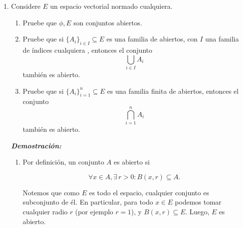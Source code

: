 \documentclass[letterpaper]{article}
\newcommand{\R}{\mathbb{R}}
\newcommand{\dem}{\textbf{\emph{Demostraci\'on: }}}
\newcommand{\norm}[1]{\lVert #1\rVert }
\begin{document}
\begin{enumerate}
\textbf{(b):} Sean $A\in\mathcal{M}_{d\times d},\, x\in\R^d$,

\[\norm{Ax}_1=\dfrac{\norm{Ax}_1}{\norm{x}_1}\norm{x}_1={\bigg\lVert\dfrac{Ax}{\norm{x}_1}\bigg\rVert}_1\norm{x}_1={\bigg\lVert A\dfrac{x}{\norm{x}_1}\bigg\rVert}_1\norm{x}_1\leq\sup_{\substack{y\in\R^d :\\
                  \norm{y}_1=1}}\norm{Ay}_1 \norm{x}_1
                  =\norm{A}\norm{x}_1\]
    
donde utilizamos que ${\bigg\lVert\dfrac{x}{\norm{x}_1}\bigg\rVert}_1=\dfrac{1}{\norm{x_1}}\norm{x_1}=1$.

\textbf{(c):} Sean $A,\, B\in\mathcal{M}_{d\times d}$,

\[\norm{AB}=\sup_{\substack{x\in\R^d :\\
                  \norm{x}_1=1}}\norm{(AB)x}_1=
            \sup_{\substack{x\in\R^d :\\
                  \norm{x}_1=1}}\norm{A(Bx)}_1\underbrace{\leq}_{(b)}
            \sup_{\substack{x\in\R^d :\\
                  \norm{x}_1=1}}\norm{A}\norm{(Bx)}_1=
            \norm{A}\sup_{\substack{x\in\R^d :\\
                  \norm{x}_1=1}}\norm{(Bx)}_1=
            \norm{A}\norm{B} \mbox{ }
\]

\item Considere $E$ un espacio vectorial normado cualquiera.
\begin{enumerate}
    \item Pruebe que $\phi, E$ son conjuntos abiertos.
    \item Pruebe que si $\{A_i\}_{i\in I}\subseteq E$ es una familia de abiertos, con $I$ una familia de índices cualquiera , entonces el conjunto
    \[\bigcup_{i\in I}A_i\]
    también es abierto.
    \item Pruebe que si $\{A_i\}_{i=1}^n\subseteq E$ es una familia finita de abiertos, entonces el conjunto
    \[\bigcap_{i=1}^nA_i\]
    también es abierto.
\end{enumerate}

\dem

\begin{enumerate}
    \item Por definición, un conjunto $A$ es abierto si
    
    \[\forall x\in A, \exists\, r>0 : B(x,r)\subseteq A.\]
    
    Notemos que como $E$ es todo el espacio, cualquier conjunto es subconjunto de él. En particular, para todo $x\in E$ podemos tomar cualquier radio $r$ (por ejemplo $r=1$), y $B(x,r)\subseteq E$. Luego, $E$ es abierto.
    

\end{enumerate}
\end{enumerate}
\end{document}
